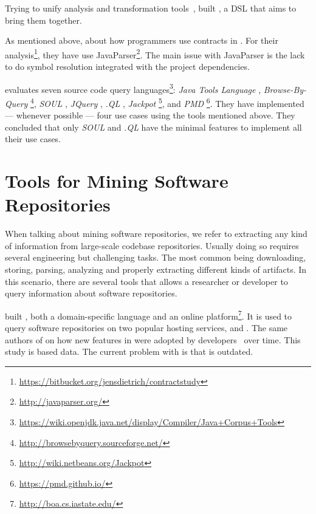 Trying to unify analysis and transformation tools~\cite{vinjuHowMakeBridge2006}, \cite{klintRASCALDomainSpecific2009} built \rascal, a DSL that aims to bring them together.

As mentioned above, \cite{dietrichContractsWildStudy2017a}  about how programmers use contracts in \mavencentral{}.
For their analysis\footnote{\url{https://bitbucket.org/jensdietrich/contractstudy}}, they have use JavaParser\footnote{\url{http://javaparser.org/}}.
The main issue with JavaParser is the lack to do symbol resolution integrated with the project dependencies.

\cite{urmaProgrammingLanguageEvolution2012} evaluates seven source code query languages\footnote{\url{https://wiki.openjdk.java.net/display/Compiler/Java+Corpus+Tools}}:
\emph{Java Tools Language} \cite{cohenJTLJavaTools},
\emph{Browse-By-Query} \footnote{\url{http://browsebyquery.sourceforge.net/}},
\emph{SOUL} \cite{derooverSOULToolSuite2011},
\emph{JQuery} \cite{volderJqueryGenericCode2006},
\emph{.QL} \cite{moorKeynoteAddressQL2007},
\emph{Jackpot} \footnote{\url{http://wiki.netbeans.org/Jackpot}}, and
\emph{PMD} \footnote{\url{https://pmd.github.io/}}.
They have implemented --- whenever possible --- four use cases using the tools mentioned above.
They concluded that only \emph{SOUL} and \emph{.QL} have the minimal features to implement all their use cases.

\section{Tools for Mining Software Repositories}
\label{sec:lr:mining}

When talking about mining software repositories, we refer to extracting any kind of information from large-scale codebase repositories. 
Usually doing so requires several engineering but challenging tasks.
The most common being downloading, storing, parsing, analyzing and properly extracting different kinds of artifacts.
In this scenario, there are several tools that allows a researcher or developer to query information about software repositories.

\cite{dyerBoaLanguageInfrastructure2013,dyerDeclarativeVisitorsEase2013} built \boa{}, both a domain-specific language and an online platform\footnote{\url{http://boa.cs.iastate.edu/}}. 
It is used to query software repositories on two popular hosting services, \github{} and \sourceforge{}.
The same authors of \boa{}  on
how new features
in \java{} were adopted by developers~\cite{dyerMiningBillionsAST2014} over time.
This study is based \sourceforge{} data.
The current problem with \sourceforge{} is that is outdated.

